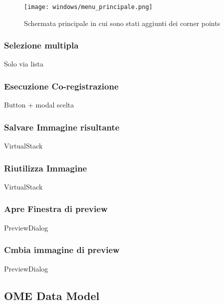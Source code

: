 \begin{figure}[H]
    \centering
    \texttt{[image: windows/menu\_principale.png]}
    \caption{Schermata principale in cui sono stati aggiunti dei corner points}
    \label{fig:15}
\end{figure}

\subsubsection{Selezione multipla}
\noindent Solo via lista

\subsubsection{Esecuzione Co-registrazione}
\noindent Button + modal scelta
\subsubsection{Salvare Immagine risultante}
\noindent VirtualStack
\subsubsection{Riutilizza Immagine}
\noindent VirtualStack

\subsubsection{Apre Finestra di preview}
\noindent PreviewDialog
\subsubsection{Cmbia immagine di preview}
\noindent PreviewDialog


\subsection{OME Data Model}
\noindent 